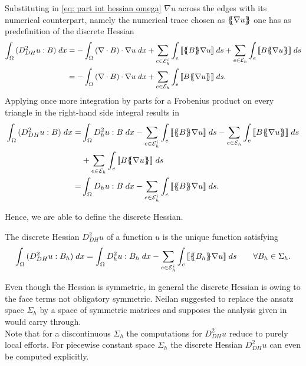 Substituting in \eqref{eq: part int hessian omega} $\nabla u$ across the edges with its numerical counterpart, namely the numerical trace chosen as $\{\!\!\{ \nabla u \}\!\!\}$ one has as predefinition of the discrete Hessian
	\begin{align}
		\myIntX  \Omega { (D_{DH}^2 u : B) }
		&= - \myIntX  \Omega { \left(\nabla \cdot B\right) \cdot \nabla u}
		+ \sum_{ e \in \edgesi} \myIntS e {  \jump {\average B \nabla u } }
				+ \sum_{ e \in \edges} \myIntS e { \jump {B \average {\nabla u} }}  \nonumber \\
		&= - \myIntX  \Omega { \left(\nabla \cdot B\right) \cdot \nabla u}
				+ \sum_{ e \in \edges} \myIntS e {  \jump{B \average {\nabla u} }}.	
	\end{align}
Applying once more integration by parts for a Frobenius product on every triangle in the right-hand side integral results in
	\begin{align}
		\myIntX  \Omega { (D_{DH}^2 u : B) }
		=& \myIntX  \Omega { D^2_h u: B }
			-\sum_{ e \in \edgesi} \myIntS e {  \jump {\average B  \nabla u }}
			- \sum_{ e \in \edges} \myIntS e { \jump {B \average {\nabla u} }}\nonumber \\		
			&+ \sum_{ e \in \edges} \myIntS e {  \jump {B \average {\nabla u} }}		\nonumber \\
		=& \myIntX  \Omega { D_h u: B}
			 -\sum_{ e \in \edgesi} \myIntS e {  \jump {\average B  \nabla u }	}.
	\end{align}

Hence, we are able to define the discrete Hessian.
\begin{definition} \label{def: discrete Hessian}
	The discrete Hessian $D_{DH}^2 u$ of a function $u$ is the unique function satisfying
	\begin{align}
		\int_{\Omega} {{ (D_{DH}^2 u : B_h) }\;dx}
		= \int_{\Omega} {{ D^2_h u: B_h}\;dx}
			 -\sum_{ e \in \mathcal{E}_h^i} \int_{e} {{  \llbracket \{\!\!\{ B_h \}\!\!\} \nabla u  \rrbracket}\;ds}\qquad \forall B_h \in \Sigma_h. \label{eq: discrete hessian}
	\end{align}
\end{definition}

Even though the Hessian is symmetric, in general the discrete Hessian is owing to the face terms not obligatory symmetric. Neilan suggested to replace the ansatz space $\Sigma_h$ by a space of symmetric matrices and supposes the analysis given in \cite{Neilan2014} would carry through.\\
Note that for a discontinuous $\Sigma_h$ the computations for $D_{DH}^2 u$ reduce to purely local efforts. For piecewise constant space $\Sigma_h$ the discrete Hessian $D_{DH}^2 u$ can even be computed explicitly.

